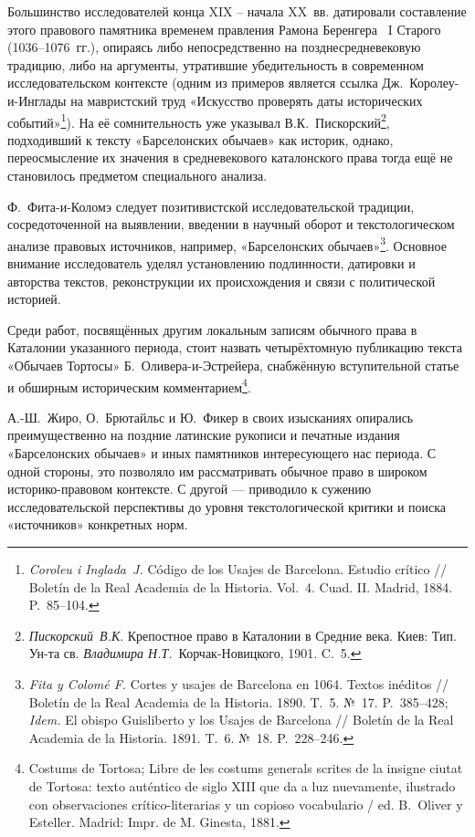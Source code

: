Большинство исследователей конца XIX -- начала XX~вв. датировали составление этого правового памятника временем правления Рамона Беренгера ~I Старого (1036--1076~гг.), опираясь либо непосредственно на позднесредневековую традицию, либо на аргументы, утратившие убедительность в современном исследовательском контексте (одним из примеров является ссылка Дж.~Королеу-и-Инглады на мавристский труд «Искусство проверять даты исторических событий»\footnote{\emph{Coroleu i Inglada~J. }Código de los Usajes de Barcelona. Estudio crítico // Boletín de la Real Academia de la Historia. Vol.~4. Cuad. II. Madrid, 1884. P.~85--104.}). На её сомнительность уже указывал В.К.~Пискорский\footnote{\emph{Пискорский}\emph{~}\emph{В.К}. Крепостное право в Каталонии в Средние века. Киев: Тип. Ун-та св. \emph{Владимира Н.Т.}~Корчак-Новицкого, 1901. C.~5.}, подходивший к тексту «Барселонских обычаев» как историк, однако, переосмысление их значения в средневекового каталонского права тогда ещё не становилось предметом специального анализа.

Ф.~Фита-и-Коломэ следует позитивистской исследовательской традиции, сосредоточенной на выявлении, введении в научный оборот и текстологическом анализе правовых источников, например, «Барселонских обычаев»\footnote{\emph{Fita y Colomé F.} Cortes y usajes de Barcelona en 1064. Textos inéditos // Boletín de la Real Academia de la Historia. 1890. T.~5. №~17. P.~385--428; \emph{Idem.} El obispo Guisliberto y los Usajes de Barcelona // Boletín de la Real Academia de la Historia. 1891. T.~6. №~18. P.~228--246.}. Основное внимание исследователь уделял установлению подлинности, датировки и авторства текстов, реконструкции их происхождения и связи с политической историей.

Среди работ, посвящённых другим локальным записям обычного права в Каталонии указанного периода, стоит назвать четырёхтомную публикацию текста «Обычаев Тортосы» Б.~Оливера-и-Эстрейера, снабжённую вступительной статье и обширным историческим комментарием\footnote{Costums de Tortosa; Libre de les costums generals scrites de la insigne ciutat de Tortosa: texto auténtico de siglo XIII que da a luz nuevamente, ilustrado con observaciones crítico-literarias y un copioso vocabulario / ed. B.~Oliver y Esteller. Madrid: Impr. de M. Ginesta, 1881.}.

А.-Ш.~Жиро, О.~Брютайльс и Ю.~Фикер в своих изысканиях опирались преимущественно на поздние латинские рукописи и печатные издания «Барселонских обычаев» и иных памятников интересующего нас периода. С одной стороны, это позволяло им рассматривать обычное право в широком историко-правовом контексте. С другой --- приводило к сужению исследовательской перспективы до уровня текстологической критики и поиска «источников» конкретных норм.

